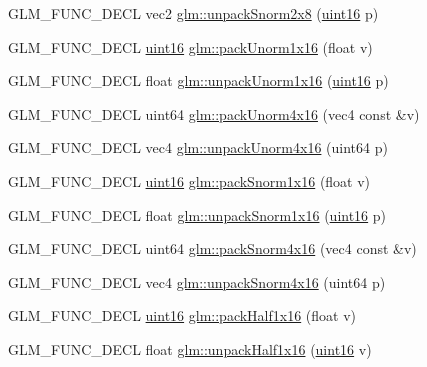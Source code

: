 \begin{DoxyCompactItemize}
G\+L\+M\+\_\+\+F\+U\+N\+C\+\_\+\+D\+E\+C\+L vec2 \hyperlink{group__gtc__packing_ga27f30f0281b88e152b0895f5e2ead878}{glm\+::unpack\+Snorm2x8} (\hyperlink{stb__image_8c_a05f6b0ae8f6a6e135b0e290c25fe0e4e}{uint16} p)
\item 
G\+L\+M\+\_\+\+F\+U\+N\+C\+\_\+\+D\+E\+C\+L \hyperlink{stb__image_8c_a05f6b0ae8f6a6e135b0e290c25fe0e4e}{uint16} \hyperlink{group__gtc__packing_ga60c7d915f5653559ae02c2f79a8c5c1d}{glm\+::pack\+Unorm1x16} (float v)
\item 
G\+L\+M\+\_\+\+F\+U\+N\+C\+\_\+\+D\+E\+C\+L float \hyperlink{group__gtc__packing_ga7770e3ade4f4764cc1b2eb42ac4ec188}{glm\+::unpack\+Unorm1x16} (\hyperlink{stb__image_8c_a05f6b0ae8f6a6e135b0e290c25fe0e4e}{uint16} p)
\item 
G\+L\+M\+\_\+\+F\+U\+N\+C\+\_\+\+D\+E\+C\+L uint64 \hyperlink{group__gtc__packing_gac561f06c908b7302537a8ef29fcb409e}{glm\+::pack\+Unorm4x16} (vec4 const \&v)
\item 
G\+L\+M\+\_\+\+F\+U\+N\+C\+\_\+\+D\+E\+C\+L vec4 \hyperlink{group__gtc__packing_gafb2b502bc406031a5618ce930139a9e3}{glm\+::unpack\+Unorm4x16} (uint64 p)
\item 
G\+L\+M\+\_\+\+F\+U\+N\+C\+\_\+\+D\+E\+C\+L \hyperlink{stb__image_8c_a05f6b0ae8f6a6e135b0e290c25fe0e4e}{uint16} \hyperlink{group__gtc__packing_gac29411d6c0f6ed0fe9f0396dfe92e0e8}{glm\+::pack\+Snorm1x16} (float v)
\item 
G\+L\+M\+\_\+\+F\+U\+N\+C\+\_\+\+D\+E\+C\+L float \hyperlink{group__gtc__packing_ga246f451cebf590726324f7a283e3d65e}{glm\+::unpack\+Snorm1x16} (\hyperlink{stb__image_8c_a05f6b0ae8f6a6e135b0e290c25fe0e4e}{uint16} p)
\item 
G\+L\+M\+\_\+\+F\+U\+N\+C\+\_\+\+D\+E\+C\+L uint64 \hyperlink{group__gtc__packing_ga9b237d7c66b7a71964e6d1f4dc06539f}{glm\+::pack\+Snorm4x16} (vec4 const \&v)
\item 
G\+L\+M\+\_\+\+F\+U\+N\+C\+\_\+\+D\+E\+C\+L vec4 \hyperlink{group__gtc__packing_ga1bfaa3f217fd7a4b6b9d3117ecb3fcac}{glm\+::unpack\+Snorm4x16} (uint64 p)
\item 
G\+L\+M\+\_\+\+F\+U\+N\+C\+\_\+\+D\+E\+C\+L \hyperlink{stb__image_8c_a05f6b0ae8f6a6e135b0e290c25fe0e4e}{uint16} \hyperlink{group__gtc__packing_gaba534b320836a35372e00af5771dd1a2}{glm\+::pack\+Half1x16} (float v)
\item 
G\+L\+M\+\_\+\+F\+U\+N\+C\+\_\+\+D\+E\+C\+L float \hyperlink{group__gtc__packing_gaa6eebcdfc746584b7d1823f1d5344fed}{glm\+::unpack\+Half1x16} (\hyperlink{stb__image_8c_a05f6b0ae8f6a6e135b0e290c25fe0e4e}{uint16} v)
\item 

\end{DoxyCompactItemize}
